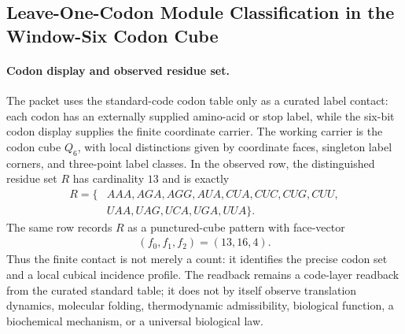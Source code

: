 
\subsection{Leave-One-Codon Module Classification in the Window-Six Codon Cube}
\label{sec:h1-leave-one-codon-out-module-classification}

\paragraph{Codon display and observed residue set.}
The packet uses the standard-code codon table only as a curated label contact: each codon has an externally supplied amino-acid or stop label, while the six-bit codon display supplies the finite coordinate carrier.  The working carrier is the codon cube $Q_6$, with local distinctions given by coordinate faces, singleton label corners, and three-point label classes.  In the observed row, the distinguished residue set $R$ has cardinality $13$ and is exactly
$$
\begin{aligned}
R=\{&AAA, AGA, AGG, AUA, CUA, CUC, CUG, CUU,\\
&UAA, UAG, UCA, UGA, UUA\}.
\end{aligned}
$$
The same row records $R$ as a punctured-cube pattern with face-vector
$$
\begin{aligned}
(f_0,f_1,f_2)=(13,16,4).
\end{aligned}
$$
Thus the finite contact is not merely a count: it identifies the precise codon set and a local cubical incidence profile.  The readback remains a code-layer readback from the curated standard table; it does not by itself observe translation dynamics, molecular folding, thermodynamic admissibility, biological function, a biochemical mechanism, or a universal biological law.

